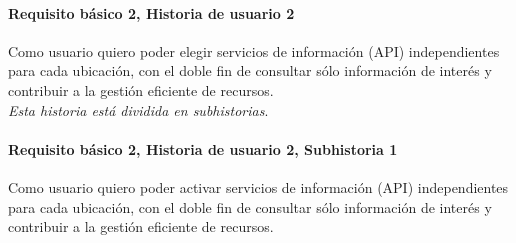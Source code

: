 \documentclass[../ei103948-project-documentation.tex]{subfiles}
\begin{document}
							\testBasicoL

							\vspace*{5mm}

				\paragraph{Requisito básico 2, Historia de usuario 2}
					Como usuario quiero poder elegir servicios de información (API) independientes para cada ubicación, con el doble fin de consultar sólo información de interés y contribuir a la gestión eficiente de recursos.\\
								\textit{Esta historia está dividida en subhistorias}.

					\newpage
			
					\paragraph*{Requisito básico 2, Historia de usuario 2, Subhistoria 1}
				Como usuario quiero poder activar servicios de información (API) independientes para cada ubicación, con el doble fin de consultar sólo información de interés y contribuir a la gestión eficiente de recursos.
\end{document}
